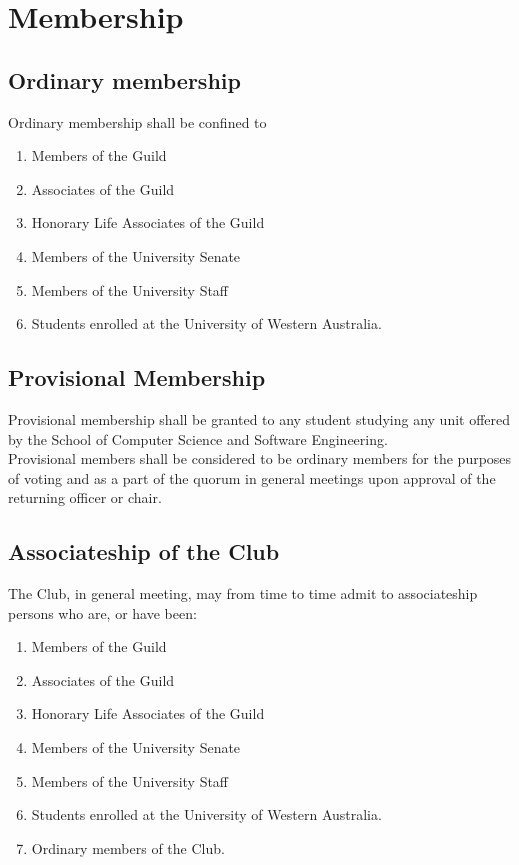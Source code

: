 \documentclass[10pt,a4paper]{report}
\begin{document}
	\section{Membership}
		\subsection{Ordinary membership}
			Ordinary membership shall be confined to
			\begin{enumerate}[label=\alph*]
				\item Members of the Guild
				\item Associates of the Guild
				\item Honorary Life Associates of the Guild
				\item Members of the University Senate
				\item Members of the University Staff
				\item Students enrolled at the University of Western Australia.
			\end{enumerate}

		\subsection{Provisional Membership}
			Provisional membership shall be granted to any student studying any unit offered by the School of Computer Science and Software Engineering. \\
			Provisional members shall be considered to be ordinary members for the purposes of voting and as a part of the quorum in general meetings upon approval of the returning officer or chair.

		\subsection{Associateship of the Club}
			The Club, in general meeting, may from time to time admit to associateship persons who are, or have been:
			\begin{enumerate}[label=\alph*]
				\item Members of the Guild
				\item Associates of the Guild
				\item Honorary Life Associates of the Guild
				\item Members of the University Senate
				\item Members of the University Staff
				\item Students enrolled at the University of Western Australia.
				\item Ordinary members of the Club.
			\end{enumerate}
\end{document}
